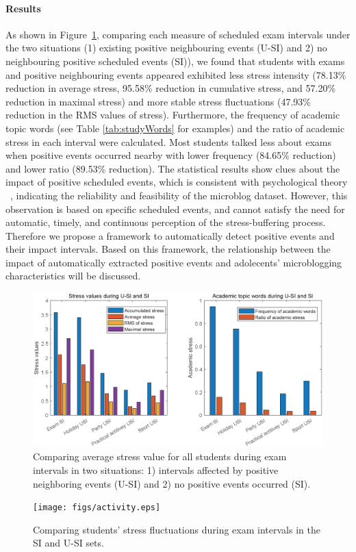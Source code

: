 \paragraph{Results}
As shown in Figure~\ref{fig:frequencyBar}, 
comparing each measure of scheduled exam intervals under the two situations 
(1) existing positive neighbouring events (U-SI) and 2) no neighbouring positive scheduled events (SI)), 
we found that students 
with exams and positive neighbouring events appeared exhibited less stress intensity
(78.13\% reduction in average stress, 95.58\%  reduction in cumulative stress, and 57.20\%  reduction in maximal stress)
and more stable stress fluctuations (47.93\% reduction in the RMS values of stress). 
Furthermore, the frequency of academic topic words (see Table \ref{tab:studyWords} for examples) 
and the ratio of academic stress in each interval were calculated. 
Most students talked less about exams when positive events occurred nearby with lower frequency (84.65\% reduction) and lower ratio (89.53\% reduction).
The statistical results show clues about the impact of positive scheduled events, 
which is consistent with psychological theory ~\citep{Cohen1984Positive, Cohen2010Positive, Needles1990Positive},
indicating the reliability and feasibility of the microblog dataset. 
However,
this observation is based on specific scheduled events,
and cannot satisfy the need for automatic, timely, and continuous perception of the stress-buffering process.
Therefore we propose a framework to automatically detect positive events and their impact intervals. 
Based on this framework, 
the relationship between the impact of automatically extracted positive events
and adolecents' microblogging characteristics will be discussed. 

\begin{figure}[h]
\centering
\includegraphics[width=\linewidth]{figs/barUSI.eps}
\caption{\small{
Comparing average stress value for all students during exam intervals in two situations: 
1) intervals affected by positive neighboring events (U-SI) and 2) no positive events occurred (SI). 
}}
\label{fig:frequencyBar}
\end{figure}

\begin{figure}[h]
\centering
\texttt{[image: figs/activity.eps]}
\caption{\small{Comparing students' stress fluctuations during exam intervals in the SI and U-SI sets.}} 
\label{fig:frequency}
\end{figure}